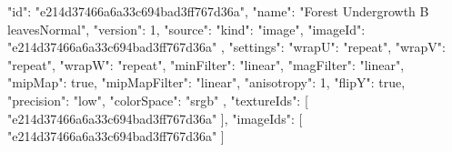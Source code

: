{
  "id": "e214d37466a6a33c694bad3ff767d36a",
  "name": "Forest Undergrowth B leavesNormal",
  "version": 1,
  "source": {
    "kind": "image",
    "imageId": "e214d37466a6a33c694bad3ff767d36a"
  },
  "settings": {
    "wrapU": "repeat",
    "wrapV": "repeat",
    "wrapW": "repeat",
    "minFilter": "linear",
    "magFilter": "linear",
    "mipMap": true,
    "mipMapFilter": "linear",
    "anisotropy": 1,
    "flipY": true,
    "precision": "low",
    "colorSpace": "srgb"
  },
  "textureIds": [
    "e214d37466a6a33c694bad3ff767d36a"
  ],
  "imageIds": [
    "e214d37466a6a33c694bad3ff767d36a"
  ]
}
